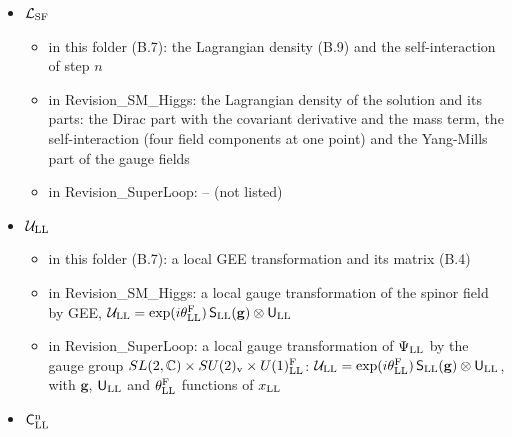 \documentclass[
  10pt,
]{article}
\providecommand{\tightlist}{%
  \setlength{\itemsep}{0pt}\setlength{\parskip}{0pt}}
\begin{document}
\begin{itemize}
  \begin{itemize}
  \tightlist
  \item
    in this folder (A.7): the Hamiltonian (A.13) and the free Dirac
    Hamiltonian
  \item
    in Revision\_SM\_Higgs: -- (not listed)
  \item
    in Revision\_SuperLoop: the Hamiltonian of the superfluid,
    \(\sum_{\vec q_{\rm LL}}\Psi^\dagger_{\rm LL}(\mathsf h_{\rm LL}-\mu_{\rm LL})\Psi_{\rm LL}-\tfrac14G_{\rm LL}\sum_\iota(\Pi^\iota_{\rm LL})^\dagger\Pi^\iota_{\rm LL}\)
  \end{itemize}
\item
  \(\mathcal L_{\rm SF}\)

  \begin{itemize}
  \tightlist
  \item
    in this folder (B.7): the Lagrangian density (B.9) and the
    self-interaction of step \(n\)
  \item
    in Revision\_SM\_Higgs: the Lagrangian density of the solution and
    its parts: the Dirac part with the covariant derivative and the mass
    term, the self-interaction (four field components at one point) and
    the Yang-Mills part of the gauge fields
  \item
    in Revision\_SuperLoop: -- (not listed)
  \end{itemize}
\item
  \(\mathcal U_{\rm LL}\)

  \begin{itemize}
  \tightlist
  \item
    in this folder (B.7): a local GEE transformation and its matrix
    (B.4)
  \item
    in Revision\_SM\_Higgs: a local gauge transformation of the spinor
    field by GEE,
    \(\mathcal U_{\rm LL}=\exp(i\theta^{\rm F}_{\rm LL})\,\mathsf S_{\rm LL}(\mathbf g)\otimes\mathsf U_{\rm LL}\)
  \item
    in Revision\_SuperLoop: a local gauge transformation of
    \(\Psi_{\rm LL}\) by the gauge group
    \(SL(2,\mathbb C)\times SU(2)_{\rm v}\times U(1)^{\rm F}_{\rm LL}\):
    \(\mathcal U_{\rm LL}=\exp(i\theta^{\rm F}_{\rm LL})\,\mathsf S_{\rm LL}(\mathbf g)\otimes\mathsf U_{\rm LL}\),
    with \(\mathbf g\), \(\mathsf U_{\rm LL}\) and
    \(\theta^{\rm F}_{\rm LL}\) functions of \(x_{\rm LL}\)
  \end{itemize}
\item
  \(\mathsf C^{\rm n}_{\rm LL}\)


\end{itemize}
\end{document}
